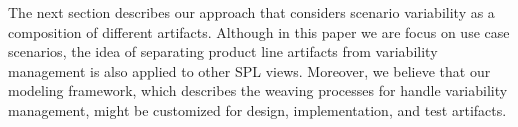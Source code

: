 \documentclass{acm_proc_article-sp}
\begin{document}
The next section describes our approach that considers scenario variability as a composition of different artifacts. Although in this paper we are focus on use case scenarios, the idea of separating product line artifacts from variability management is also applied to other SPL views. Moreover, we believe that our modeling framework, which describes the weaving processes for handle variability management, might be customized for design, implementation, and test artifacts. 







\end{document}
